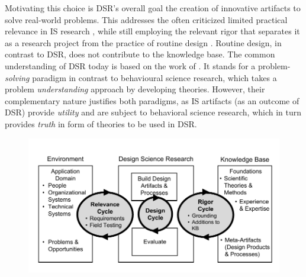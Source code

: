 Motivating this choice is \acrshort{DSR}'s overall goal the creation of innovative artifacts to solve real-world problems. This addresses the often criticized limited practical relevance in \acrshort{IS} research \citep{hirschheim}, while still employing the relevant rigor that separates it as a research project from the practice of routine design \citep{Winter2008Hevner}. Routine design, in contrast to \acrshort{DSR}, does not contribute to the knowledge base. The common understanding of \acrshort{DSR} today is based on the work of \cite{Hevner2004}. It stands for a problem-\textit{solving} paradigm in contrast to behavioural science research, which takes a problem \textit{understanding} approach by developing theories. However, their complementary nature justifies both paradigms, as IS artifacts (as an outcome of \acrshort{DSR}) provide \textit{utility} and are subject to behavioral science research, which in turn provides \textit{truth} in form of theories to be used in \acrshort{DSR}.

			
\begin{figure}[caption={Design Science Research Cycles}, label={fig:dsr}]
	{	\includegraphics[width=.8\textwidth]{figures/dsr.pdf}
	} \\
\parbox{0.8\textwidth}{}
\end{figure}


